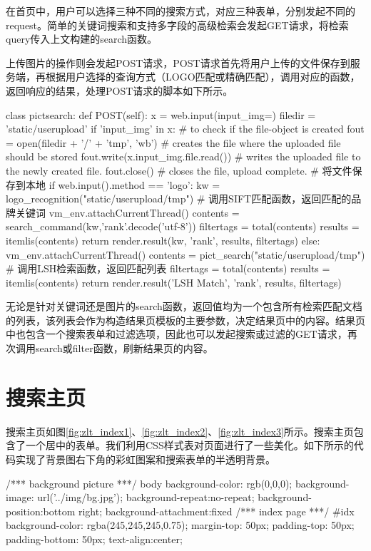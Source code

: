 在首页中，用户可以选择三种不同的搜索方式，对应三种表单，分别发起不同的request。简单的关键词搜索和支持多字段的高级检索会发起GET请求，将检索query传入上文构建的search函数。

上传图片的操作则会发起POST请求，POST请求首先将用户上传的文件保存到服务端，再根据用户选择的查询方式（LOGO匹配或精确匹配），调用对应的函数，返回响应的结果，处理POST请求的脚本如下所示。

\begin{python}
class pictsearch:
    def POST(self):
        x = web.input(input_img={})
        filedir = 'static/userupload'
        if 'input_img' in x:  # to check if the file-object is created
            fout = open(filedir + '/' + 'tmp', 'wb')
            # creates the file where the uploaded file should be stored
            fout.write(x.input_img.file.read())
            # writes the uploaded file to the newly created file.
            fout.close()  # closes the file, upload complete.
        # 将文件保存到本地
        if web.input().method == 'logo':
            kw = logo_recognition("static/userupload/tmp")  
            # 调用SIFT匹配函数，返回匹配的品牌关键词
            vm_env.attachCurrentThread()
            contents = search_command(kw,'rank'.decode('utf-8'))
            filtertags = total(contents)
            results = itemlis(contents)
            return render.result(kw, 'rank', results, filtertags)
        else:
            vm_env.attachCurrentThread()
            contents = pict_search("static/userupload/tmp")
            # 调用LSH检索函数，返回匹配列表
            filtertags = total(contents)
            results = itemlis(contents)
            return render.result('LSH Match', 'rank', results, filtertags)
\end{python}


无论是针对关键词还是图片的search函数，返回值均为一个包含所有检索匹配文档的列表，该列表会作为构造结果页模板的主要参数，决定结果页中的内容。结果页中也包含一个搜索表单和过滤选项，因此也可以发起搜索或过滤的GET请求，再次调用search或filter函数，刷新结果页的内容。


\section{搜索主页}

搜索主页如图\ref{fig:zlt_index1}、\ref{fig:zlt_index2}、\ref{fig:zlt_index3}所示。搜索主页包含了一个居中的表单。我们利用CSS样式表对页面进行了一些美化。如下所示的代码实现了背景图右下角的彩虹图案和搜索表单的半透明背景。

\begin{python}
/*** background picture ***/
body {
	background-color: rgb(0,0,0);
	background-image: url('../img/bg.jpg');
	background-repeat:no-repeat;
    background-position:bottom right;
	background-attachment:fixed
}
/*** index page ***/
#idx
{
	background-color: rgba(245,245,245,0.75);
	margin-top: 50px;
	padding-top: 50px;
	padding-bottom: 50px;
    text-align:center;
}
\end{python}

